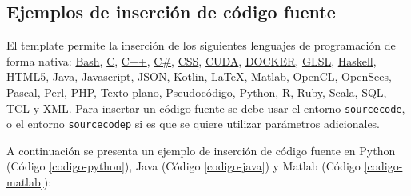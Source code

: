 		\lipsum[4]

		\begin{multicols}{2}

			\lipsum[4]


			\lipsum[1]

		\end{multicols}

	\subsection{Ejemplos de inserción de código fuente}

		\newcommand{\insertsrcmanual}[2]{\href{https://latex.ppizarror.com/informe.html\#hlp-srccode\&srctype=#1}{#2}}

		El template permite la inserción de los siguientes lenguajes de programación de forma nativa: \insertsrcmanual{bash}{Bash}, \insertsrcmanual{c}{C}, \insertsrcmanual{cpp}{C++}, \insertsrcmanual{csharp}{C\#}, \insertsrcmanual{css}{CSS}, \insertsrcmanual{cuda}{CUDA}, \insertsrcmanual{docker}{DOCKER}, \insertsrcmanual{glsl}{GLSL}, \insertsrcmanual{haskell}{Haskell}, \insertsrcmanual{html5}{HTML5}, \insertsrcmanual{java}{Java}, \insertsrcmanual{js}{Javascript}, \insertsrcmanual{json}{JSON}, \insertsrcmanual{kotlin}{Kotlin}, \insertsrcmanual{latex}{LaTeX}, \insertsrcmanual{matlab}{Matlab}, \insertsrcmanual{opencl}{OpenCL}, \insertsrcmanual{opensees}{OpenSees}, \insertsrcmanual{pascal}{Pascal}, \insertsrcmanual{perl}{Perl}, \insertsrcmanual{php}{PHP}, \insertsrcmanual{plaintext}{Texto plano}, \insertsrcmanual{pseudocode}{Pseudocódigo}, \insertsrcmanual{python}{Python}, \insertsrcmanual{r}{R}, \insertsrcmanual{ruby}{Ruby}, \insertsrcmanual{scala}{Scala}, \insertsrcmanual{sql}{SQL}, \insertsrcmanual{tcl}{TCL} y \insertsrcmanual{xml}{XML}. Para insertar un código fuente se debe usar el entorno \texttt{sourcecode}, o el entorno \texttt{sourcecodep} si es que se quiere utilizar parámetros adicionales. \newp

		A continuación se presenta un ejemplo de inserción de código fuente en Python (Código \ref{codigo-python}), Java (Código \ref{codigo-java}) y Matlab (Código \ref{codigo-matlab}):

